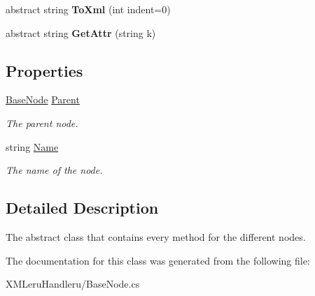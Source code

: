 \begin{DoxyCompactItemize}
\item 
\hypertarget{class_x_m_leru_handleru_1_1_base_node_af4ccbd830749f6567dcd46c3cee42b74}{}abstract string {\bfseries To\+Xml} (int indent=0)\label{class_x_m_leru_handleru_1_1_base_node_af4ccbd830749f6567dcd46c3cee42b74}

\item 
\hypertarget{class_x_m_leru_handleru_1_1_base_node_a349b1cd86da86931a5445ad81046d2f3}{}abstract string {\bfseries Get\+Attr} (string k)\label{class_x_m_leru_handleru_1_1_base_node_a349b1cd86da86931a5445ad81046d2f3}

\end{DoxyCompactItemize}
\subsection*{Properties}
\begin{DoxyCompactItemize}
\item 
\hypertarget{class_x_m_leru_handleru_1_1_base_node_ac3c3e0c083a9da350e5511163668ac81}{}\hyperlink{class_x_m_leru_handleru_1_1_base_node}{Base\+Node} \hyperlink{class_x_m_leru_handleru_1_1_base_node_ac3c3e0c083a9da350e5511163668ac81}{Parent}\label{class_x_m_leru_handleru_1_1_base_node_ac3c3e0c083a9da350e5511163668ac81}

\begin{DoxyCompactList}\small\item\em The parent node. \end{DoxyCompactList}\item 
\hypertarget{class_x_m_leru_handleru_1_1_base_node_a693bfdbaf05b7554897d475afd2f4768}{}string \hyperlink{class_x_m_leru_handleru_1_1_base_node_a693bfdbaf05b7554897d475afd2f4768}{Name}\label{class_x_m_leru_handleru_1_1_base_node_a693bfdbaf05b7554897d475afd2f4768}

\begin{DoxyCompactList}\small\item\em The name of the node. \end{DoxyCompactList}\end{DoxyCompactItemize}


\subsection{Detailed Description}
The abstract class that contains every method for the different nodes. 

The documentation for this class was generated from the following file\+:\begin{DoxyCompactItemize}
\item 
X\+M\+Leru\+Handleru/Base\+Node.\+cs\end{DoxyCompactItemize}
